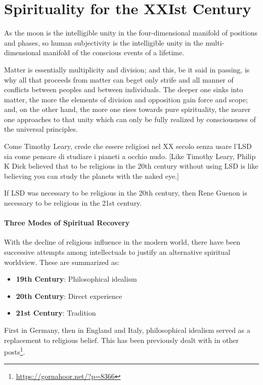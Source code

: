 \section{Spirituality for the XXIst Century}

\begin{quotex}
As the moon is the intelligible unity in the four-dimensional manifold of positions and phases, so human subjectivity is the intelligible unity in the multi-dimensional manifold of the conscious events of a lifetime. 

Matter is essentially multiplicity and division; and this, be it said in passing, is why all that proceeds from matter can beget only strife and all manner of conflicts between peoples and between individuals. The deeper one sinks into matter, the more the elements of division and opposition gain force and scope; and, on the other hand, the more one rises towards pure spirituality, the nearer one approaches to that unity which can only be fully realized by consciousness of the universal principles. 

Come Timothy Leary, crede che essere religiosi nel XX secolo senza usare l'LSD sia come pensare di studiare i pianeti a occhio nudo. [Like Timothy Leary, Philip K Dick believed that to be religious in the 20th century without using LSD is like believing you can study the planets with the naked eye.] 

If LSD was necessary to be religious in the 20th century, then Rene Guenon is necessary to be religious in the 21st century. 

\end{quotex}
\paragraph{Three Modes of Spiritual Recovery}
With the decline of religious influence in the modern world, there have been successive attempts among intellectuals to justify an alternative spiritual worldview. These are summarized as:

\begin{itemize}
\item \textbf{19th Century}: Philosophical idealism 
\item \textbf{20th Century}: Direct experience 
\item \textbf{21st Century}: Tradition 
\end{itemize}
First in Germany, then in England and Italy, philosophical idealism served as a replacement to religious belief. This has been previously dealt with in other posts\footnote{\url{https://gornahoor.net/?p=8366}}.

